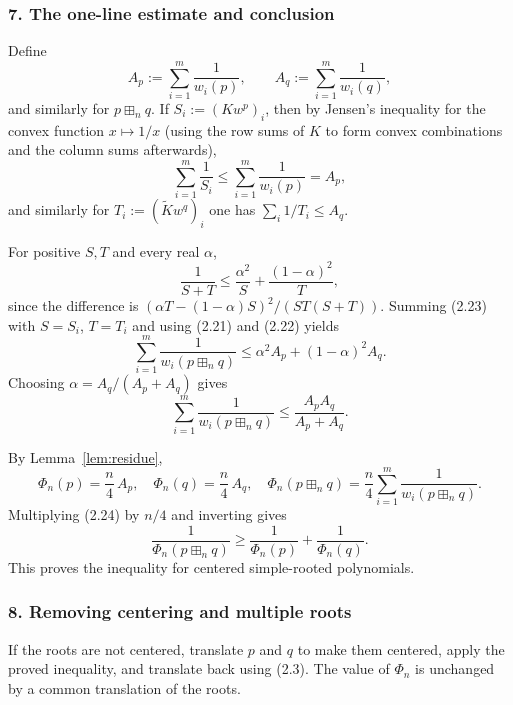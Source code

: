 \documentclass{article}
\begin{document}
\subsubsection*{7. The one-line estimate and conclusion}

Define
\[
  A_p := \sum_{i=1}^m \frac{1}{w_i(p)}, \qquad A_q := \sum_{i=1}^m \frac{1}{w_i(q)},
\]
and similarly for $p \boxplus_n q$. If $S_i := (Kw^p)_i$, then by Jensen's inequality for the convex function $x \mapsto 1/x$ (using the row sums of $K$ to form convex combinations and the column sums afterwards),
\begin{equation}
  \sum_{i=1}^m \frac{1}{S_i} \le \sum_{i=1}^m \frac{1}{w_i(p)} = A_p, \tag{2.22}
\end{equation}
and similarly for $T_i := (\widetilde{K} w^q)_i$ one has $\sum_i 1/T_i \le A_q$.

For positive $S, T$ and every real $\alpha$,
\begin{equation}
  \frac{1}{S+T} \le \frac{\alpha^2}{S} + \frac{(1-\alpha)^2}{T}, \tag{2.23}
\end{equation}
since the difference is $(\alpha T - (1-\alpha)S)^2/(ST(S+T))$. Summing (2.23) with $S = S_i$, $T = T_i$ and using (2.21) and (2.22) yields
\[
  \sum_{i=1}^m \frac{1}{w_i(p \boxplus_n q)} \le \alpha^2 A_p + (1-\alpha)^2 A_q.
\]
Choosing $\alpha = A_q/(A_p + A_q)$ gives
\begin{equation}
  \sum_{i=1}^m \frac{1}{w_i(p \boxplus_n q)} \le \frac{A_p A_q}{A_p + A_q}. \tag{2.24}
\end{equation}

By Lemma~\ref{lem:residue},
\[
  \Phi_n(p) = \frac{n}{4}\,A_p, \quad \Phi_n(q) = \frac{n}{4}\,A_q, \quad
  \Phi_n(p \boxplus_n q) = \frac{n}{4}\sum_{i=1}^m \frac{1}{w_i(p \boxplus_n q)}.
\]
Multiplying (2.24) by $n/4$ and inverting gives
\[
  \frac{1}{\Phi_n(p \boxplus_n q)} \ge \frac{1}{\Phi_n(p)} + \frac{1}{\Phi_n(q)}.
\]
This proves the inequality for centered simple-rooted polynomials.

\subsubsection*{8. Removing centering and multiple roots}

If the roots are not centered, translate $p$ and $q$ to make them centered, apply the proved inequality, and translate back using (2.3). The value of $\Phi_n$ is unchanged by a common translation of the roots.
\end{document}
